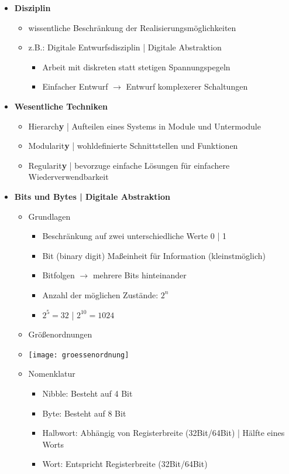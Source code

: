 \begin{itemize}
\item \textbf{Disziplin}
	\begin{itemize}
	\item wissentliche Beschränkung der Realisierungsmöglichkeiten
	\item z.B.: Digitale Entwurfsdisziplin | Digitale Abstraktion 
		\begin{itemize}
		\item Arbeit mit diskreten statt stetigen Spannungspegeln
		\item Einfacher Entwurf $\rightarrow$ Entwurf komplexerer Schaltungen
		\end{itemize}
	\end{itemize}

\item \textbf{Wesentliche Techniken}
	\begin{itemize}
	\item Hierarch\textbf{y} | Aufteilen eines Systems in Module und Untermodule
	\item Modularit\textbf{y} | wohldefinierte Schnittstellen und Funktionen
	\item Regularit\textbf{y} | bevorzuge einfache Lösungen für einfachere Wiederverwendbarkeit
	\end{itemize} 

\item \textbf{Bits und Bytes | Digitale Abstraktion}
	\begin{itemize}
	\item Grundlagen 
		\begin{itemize}
		\item Beschränkung auf zwei unterschiedliche Werte 0 | 1
		\item Bit (binary digit) Maßeinheit für Information (kleinstmöglich)
		\item Bitfolgen $\rightarrow$ mehrere Bits hinteinander
		\item Anzahl der möglichen Zustände: $2^n$
		\item $2^5 = 32$ | $2^{10} = 1024$
		\end{itemize}		 
	
	\item Größenordnungen
	\item[] %
				\texttt{[image: groessenordnung]}
		
	\item Nomenklatur
		\begin{itemize}
		\item Nibble: Besteht auf 4 Bit
		\item Byte: Besteht auf 8 Bit
		\item Halbwort: Abhängig von Registerbreite (32Bit/64Bit) | Hälfte eines Worts
		\item Wort: Entspricht Registerbreite (32Bit/64Bit)
		\end{itemize}
	\end{itemize}
	
	
\end{itemize}

